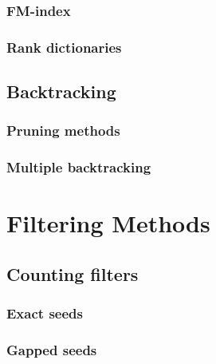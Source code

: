 \subsection{FM-index}
\subsection{Rank dictionaries}
\section{Backtracking}
\subsection{Pruning methods}
\subsection{Multiple backtracking}

\chapter{Filtering Methods}
\section{Counting filters}
\subsection{Exact seeds}
\subsection{Gapped seeds}
